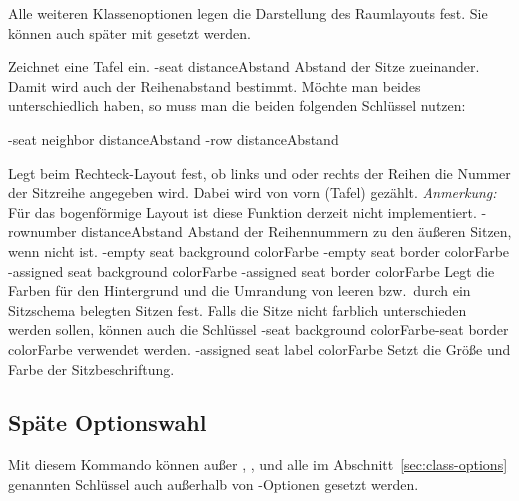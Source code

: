 \documentclass{cnltx-doc}
\begin{document}
Alle weiteren Klassenoptionen legen die Darstellung des Raumlayouts fest.
Sie können auch später mit  gesetzt werden.
\begin{options}
  Zeichnet eine Tafel ein.
  \keyval-{seat distance}{Abstand}\Default{2pt}
  Abstand der Sitze zueinander. Damit wird auch der Reihenabstand bestimmt.
  Möchte man beides unterschiedlich haben, so muss man die beiden folgenden
  Schlüssel nutzen:
  
  \keyval-{seat neighbor distance}{Abstand}\Default*{2pt}
  \keyval-{row distance}{Abstand}\Default{2pt}

  Legt beim Rechteck-Layout fest, ob links und oder rechts der Reihen die Nummer
  der Sitzreihe angegeben wird. Dabei wird von vorn (Tafel) gezählt.\newline
  \emph{Anmerkung:} Für das bogenförmige Layout ist diese Funktion derzeit
  nicht implementiert.
  \keyval-{rownumber distance}{Abstand}\Default{2pt}
  Abstand der Reihennummern zu den äußeren Sitzen, wenn 
  nicht  ist.
  \keyval-{empty seat background color}{Farbe}
  \keyval-{empty seat border color}{Farbe}
  \keyval-{assigned seat background color}{Farbe}
  \keyval-{assigned seat border color}{Farbe}
  Legt die Farben für den Hintergrund und die Umrandung von leeren bzw.\ durch
  ein Sitzschema belegten Sitzen fest.
  Falls die Sitze nicht farblich unterschieden werden sollen, können auch die
  Schlüssel
  \keyval-{seat background color}{Farbe}\Default*
  \keyval-{seat border color}{Farbe}\Default
  verwendet werden.
  \keyval-{assigned seat label color}{Farbe}
  Setzt die Größe und Farbe der Sitzbeschriftung.
\end{options}
\subsection{Späte Optionswahl}
\label{sec:late-options}
\begin{commands}
  Mit diesem Kommando können außer
  , ,  und  alle
  im Abschnitt~\ref{sec:class-options} genannten Schlüssel auch
  außerhalb von -Optionen gesetzt werden.
\end{commands}
\end{document}
